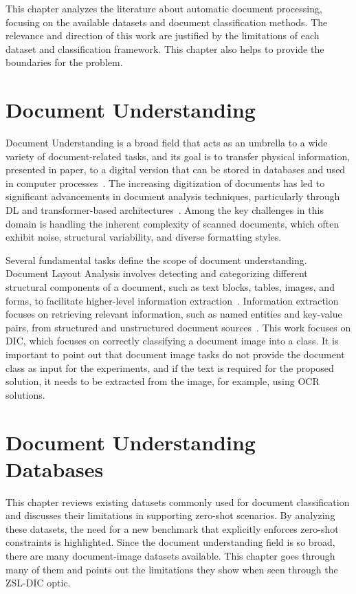 This chapter analyzes the literature about automatic document processing, focusing on the available datasets and document classification methods. The relevance and direction of this work are justified by the limitations of each dataset and classification framework. This chapter also helps to provide the boundaries for the problem.

\section{Document Understanding}

Document Understanding is a broad field that acts as an umbrella to a wide variety of document-related tasks, and its goal is to transfer physical information, presented in paper, to a digital version that can be stored in databases and used in computer processes~\cite{nagy_twenty_2000}. The increasing digitization of documents has led to significant advancements in document analysis techniques, particularly through \gls{DL} and transformer-based architectures~\cite{abdallah_survey_2024}. Among the key challenges in this domain is handling the inherent complexity of scanned documents, which often exhibit noise, structural variability, and diverse formatting styles.

Several fundamental tasks define the scope of document understanding. Document Layout Analysis involves detecting and categorizing different structural components of a document, such as text blocks, tables, images, and forms, to facilitate higher-level information extraction~\cite{zhong_publaynet_2019}. Information extraction focuses on retrieving relevant information, such as named entities and key-value pairs, from structured and unstructured document sources~\cite{abdallah_survey_2024}. This work focuses on \gls{DIC}, which focuses on correctly classifying a document image into a class. It is important to point out that document image tasks do not provide the document class as input for the experiments, and if the text is required for the proposed solution, it needs to be extracted from the image, for example, using \gls{OCR} solutions.

\section{Document Understanding Databases}

This chapter reviews existing datasets commonly used for document classification and discusses their limitations in supporting zero-shot scenarios. By analyzing these datasets, the need for a new benchmark that explicitly enforces zero-shot constraints is highlighted. Since the document understanding field is so broad, there are many document-image datasets available. This chapter goes through many of them and points out the limitations they show when seen through the \gls{ZSL}-\gls{DIC} optic.

